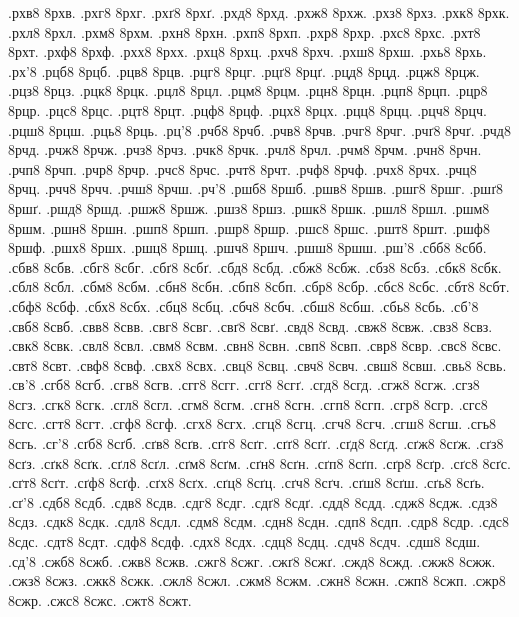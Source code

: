 {.рхв8 8рхв.
.рхг8 8рхг.
.рхґ8 8рхґ.
.рхд8 8рхд.
.рхж8 8рхж.
.рхз8 8рхз.
.рхк8 8рхк.
.рхл8 8рхл.
.рхм8 8рхм.
.рхн8 8рхн.
.рхп8 8рхп.
.рхр8 8рхр.
.рхс8 8рхс.
.рхт8 8рхт.
.рхф8 8рхф.
.рхх8 8рхх.
.рхц8 8рхц.
.рхч8 8рхч.
.рхш8 8рхш.
.рхь8 8рхь.
.рх'8
.рцб8 8рцб.
.рцв8 8рцв.
.рцг8 8рцг.
.рцґ8 8рцґ.
.рцд8 8рцд.
.рцж8 8рцж.
.рцз8 8рцз.
.рцк8 8рцк.
.рцл8 8рцл.
.рцм8 8рцм.
.рцн8 8рцн.
.рцп8 8рцп.
.рцр8 8рцр.
.рцс8 8рцс.
.рцт8 8рцт.
.рцф8 8рцф.
.рцх8 8рцх.
.рцц8 8рцц.
.рцч8 8рцч.
.рцш8 8рцш.
.рць8 8рць.
.рц'8
.рчб8 8рчб.
.рчв8 8рчв.
.рчг8 8рчг.
.рчґ8 8рчґ.
.рчд8 8рчд.
.рчж8 8рчж.
.рчз8 8рчз.
.рчк8 8рчк.
.рчл8 8рчл.
.рчм8 8рчм.
.рчн8 8рчн.
.рчп8 8рчп.
.рчр8 8рчр.
.рчс8 8рчс.
.рчт8 8рчт.
.рчф8 8рчф.
.рчх8 8рчх.
.рчц8 8рчц.
.рчч8 8рчч.
.рчш8 8рчш.
.рч'8
.ршб8 8ршб.
.ршв8 8ршв.
.ршг8 8ршг.
.ршґ8 8ршґ.
.ршд8 8ршд.
.ршж8 8ршж.
.ршз8 8ршз.
.ршк8 8ршк.
.ршл8 8ршл.
.ршм8 8ршм.
.ршн8 8ршн.
.ршп8 8ршп.
.ршр8 8ршр.
.ршс8 8ршс.
.ршт8 8ршт.
.ршф8 8ршф.
.ршх8 8ршх.
.ршц8 8ршц.
.ршч8 8ршч.
.ршш8 8ршш.
.рш'8
.сбб8 8сбб.
.сбв8 8сбв.
.сбг8 8сбг.
.сбґ8 8сбґ.
.сбд8 8сбд.
.сбж8 8сбж.
.сбз8 8сбз.
.сбк8 8сбк.
.сбл8 8сбл.
.сбм8 8сбм.
.сбн8 8сбн.
.сбп8 8сбп.
.сбр8 8сбр.
.сбс8 8сбс.
.сбт8 8сбт.
.сбф8 8сбф.
.сбх8 8сбх.
.сбц8 8сбц.
.сбч8 8сбч.
.сбш8 8сбш.
.сбь8 8сбь.
.сб'8
.свб8 8свб.
.свв8 8свв.
.свг8 8свг.
.свґ8 8свґ.
.свд8 8свд.
.свж8 8свж.
.свз8 8свз.
.свк8 8свк.
.свл8 8свл.
.свм8 8свм.
.свн8 8свн.
.свп8 8свп.
.свр8 8свр.
.свс8 8свс.
.свт8 8свт.
.свф8 8свф.
.свх8 8свх.
.свц8 8свц.
.свч8 8свч.
.свш8 8свш.
.свь8 8свь.
.св'8
.сгб8 8сгб.
.сгв8 8сгв.
.сгг8 8сгг.
.сгґ8 8сгґ.
.сгд8 8сгд.
.сгж8 8сгж.
.сгз8 8сгз.
.сгк8 8сгк.
.сгл8 8сгл.
.сгм8 8сгм.
.сгн8 8сгн.
.сгп8 8сгп.
.сгр8 8сгр.
.сгс8 8сгс.
.сгт8 8сгт.
.сгф8 8сгф.
.сгх8 8сгх.
.сгц8 8сгц.
.сгч8 8сгч.
.сгш8 8сгш.
.сгь8 8сгь.
.сг'8
.сґб8 8сґб.
.сґв8 8сґв.
.сґг8 8сґг.
.сґґ8 8сґґ.
.сґд8 8сґд.
.сґж8 8сґж.
.сґз8 8сґз.
.сґк8 8сґк.
.сґл8 8сґл.
.сґм8 8сґм.
.сґн8 8сґн.
.сґп8 8сґп.
.сґр8 8сґр.
.сґс8 8сґс.
.сґт8 8сґт.
.сґф8 8сґф.
.сґх8 8сґх.
.сґц8 8сґц.
.сґч8 8сґч.
.сґш8 8сґш.
.сґь8 8сґь.
.сґ'8
.сдб8 8сдб.
.сдв8 8сдв.
.сдг8 8сдг.
.сдґ8 8сдґ.
.сдд8 8сдд.
.сдж8 8сдж.
.сдз8 8сдз.
.сдк8 8сдк.
.сдл8 8сдл.
.сдм8 8сдм.
.сдн8 8сдн.
.сдп8 8сдп.
.сдр8 8сдр.
.сдс8 8сдс.
.сдт8 8сдт.
.сдф8 8сдф.
.сдх8 8сдх.
.сдц8 8сдц.
.сдч8 8сдч.
.сдш8 8сдш.
.сд'8
.сжб8 8сжб.
.сжв8 8сжв.
.сжг8 8сжг.
.сжґ8 8сжґ.
.сжд8 8сжд.
.сжж8 8сжж.
.сжз8 8сжз.
.сжк8 8сжк.
.сжл8 8сжл.
.сжм8 8сжм.
.сжн8 8сжн.
.сжп8 8сжп.
.сжр8 8сжр.
.сжс8 8сжс.
.сжт8 8сжт.
}

